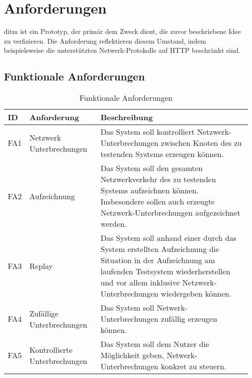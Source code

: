 \documentclass[12pt,a4paper]{report}
\begin{document}
\section{Anforderungen}
ditm ist ein Prototyp, der primär dem Zweck dient, die zuvor beschriebene Idee zu verfizieren.
Die Anforderung reflektieren diesem Umstand, indem beispielsweise die unterstützten Netwerk-Protokolle auf HTTP beschränkt sind.
\subsection{Funktionale Anforderungen}
\begin{table}[h]
	\centering
    \caption{Funktionale Anforderungen}
	\label{tab:fa}
	\begin{tabular}{|l|l|p{7cm}|}
		\hline
		ID   & Anforderung                   & Beschreibung                                                                                                                                                                                                          \\ \hline
		FA1  & Netzwerk Unterbrechungen      & Das System soll kontrolliert Netzwerk-Unterbrechungen zwischen Knoten des zu testenden Systems erzeugen können.                                                                                                       \\ \hline
		FA2  & Aufzeichnung                  & Das System soll den gesamten Netzwerkverkehr des zu testenden Systems aufzeichnen können. Insbesondere sollen auch erzeugte Netzwerk-Unterbrechungen aufgezeichnet werden.                                            \\ \hline
		FA3  & Replay                        & Das System soll anhand einer durch das System erstellten Aufzeichnung die Situation in der Aufzeichnung am laufenden Testsystem wiederherstellen und vor allem inklusive Netzwerk-Unterbrechungen wiedergeben können. \\ \hline
		FA4  & Zufällige Unterbrechungen     & Das System soll Netwerk-Unterbrechungen zufällig erzeugen können.                                                                                                                                                     \\ \hline
		FA5  & Kontrollierte Unterbrechungen & Das System soll dem Nutzer die Möglichkeit geben, Netwerk-Unterbrechungen konkret zu steuern.                                                                                                                         \\ \hline

\end{tabular}
\end{table}
\end{document}

